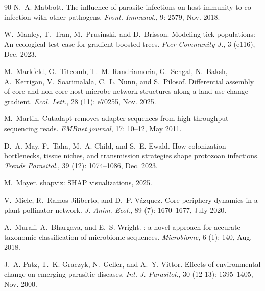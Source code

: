 \documentclass[oneside, a4paper, onecolumn, 11pt]{article}
\begin{document}
\begin{thebibliography}{90}
N.~A. Mabbott.
\newblock The influence of parasite infections on host immunity to co-infection with other pathogens.
\newblock \emph{Front. Immunol.}, 9: 2579, Nov. 2018.

W.~Manley, T.~Tran, M.~Prusinski, and D.~Brisson.
\newblock Modeling tick populations: An ecological test case for gradient boosted trees.
\newblock \emph{Peer Community J.}, 3 (e116), Dec. 2023.

M.~Markfeld, G.~Titcomb, T.~M. Randriamoria, G.~Sehgal, N.~Baksh, A.~Kerrigan, V.~Soarimalala, C.~L. Nunn, and S.~Pilosof.
\newblock Differential assembly of core and non-core host-microbe network structures along a land-use change gradient.
\newblock \emph{Ecol. Lett.}, 28 (11): e70255, Nov. 2025.

M.~Martin.
\newblock Cutadapt removes adapter sequences from high-throughput sequencing reads.
\newblock \emph{EMBnet.journal}, 17: 10--12, May 2011.

D.~A. May, F.~Taha, M.~A. Child, and S.~E. Ewald.
\newblock How colonization bottlenecks, tissue niches, and transmission strategies shape protozoan infections.
\newblock \emph{Trends Parasitol.}, 39 (12): 1074--1086, Dec. 2023.

M.~Mayer.
\newblock shapviz: {SHAP} visualizations, 2025.

V.~Miele, R.~Ramos-Jiliberto, and D.~P. Vázquez.
\newblock Core-periphery dynamics in a plant-pollinator network.
\newblock \emph{J. Anim. Ecol.}, 89 (7): 1670--1677, July 2020.

A.~Murali, A.~Bhargava, and E.~S. Wright.
: a novel approach for accurate taxonomic classification of microbiome sequences.
\newblock \emph{Microbiome}, 6 (1): 140, Aug. 2018.

J.~A. Patz, T.~K. Graczyk, N.~Geller, and A.~Y. Vittor.
\newblock Effects of environmental change on emerging parasitic diseases.
\newblock \emph{Int. J. Parasitol.}, 30 (12-13): 1395--1405, Nov. 2000.


\end{thebibliography}
\end{document}
